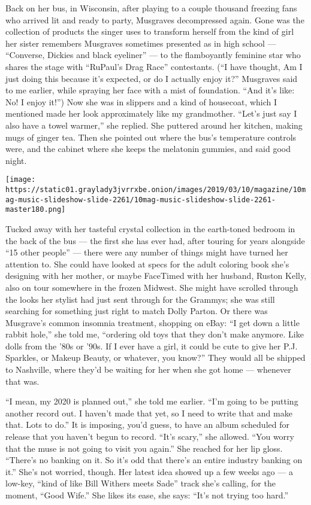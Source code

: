 Back on her bus, in Wisconsin, after playing to a couple thousand
freezing fans who arrived lit and ready to party, Musgraves decompressed
again. Gone was the collection of products the singer uses to transform
herself from the kind of girl her sister remembers Musgraves sometimes
presented as in high school --- ``Converse, Dickies and black eyeliner''
--- to the flamboyantly feminine star who shares the stage with
``RuPaul's Drag Race'' contestants. (``I have thought, Am I just doing
this because it's expected, or do I actually enjoy it?'' Musgraves said
to me earlier, while spraying her face with a mist of foundation. ``And
it's like: No! I enjoy it!'') Now she was in slippers and a kind of
housecoat, which I mentioned made her look approximately like my
grandmother. ``Let's just say I also have a towel warmer,'' she replied.
She puttered around her kitchen, making mugs of ginger tea. Then she
pointed out where the bus's temperature controls were, and the cabinet
where she keeps the melatonin gummies, and said good night.

\texttt{[image: https://static01.graylady3jvrrxbe.onion/images/2019/03/10/magazine/10mag-music-slideshow-slide-2261/10mag-music-slideshow-slide-2261-master180.png]}

Tucked away with her tasteful crystal collection in the earth-toned
bedroom in the back of the bus --- the first she has ever had, after
touring for years alongside ``15 other people'' --- there were any
number of things might have turned her attention to. She could have
looked at specs for the adult coloring book she's designing with her
mother, or maybe FaceTimed with her husband, Ruston Kelly, also on tour
somewhere in the frozen Midwest. She might have scrolled through the
looks her stylist had just sent through for the Grammys; she was still
searching for something just right to match Dolly Parton. Or there was
Musgrave's common insomnia treatment, shopping on eBay: ``I get down a
little rabbit hole,'' she told me, ``ordering old toys that they don't
make anymore. Like dolls from the '80s or '90s. If I ever have a girl,
it could be cute to give her P.J. Sparkles, or Makeup Beauty, or
whatever, you know?'' They would all be shipped to Nashville, where
they'd be waiting for her when she got home --- whenever that was.

``I mean, my 2020 is planned out,'' she told me earlier. ``I'm going to
be putting another record out. I haven't made that yet, so I need to
write that and make that. Lots to do.'' It is imposing, you'd guess, to
have an album scheduled for release that you haven't begun to record.
``It's scary,'' she allowed. ``You worry that the muse is not going to
visit you again.'' She reached for her lip gloss. ``There's no banking
on it. So it's odd that there's an entire industry banking on it.''
She's not worried, though. Her latest idea showed up a few weeks ago ---
a low-key, ``kind of like Bill Withers meets Sade'' track she's calling,
for the moment, ``Good Wife.'' She likes its ease, she says: ``It's not
trying too hard.''

